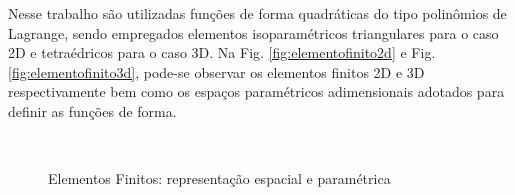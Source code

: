 \documentclass[tese_patricia]{subfiles}%
\begin{document}
Nesse trabalho são utilizadas funções de forma quadráticas do tipo polinômios de Lagrange, sendo empregados elementos isoparamétricos triangulares para o caso 2D e tetraédricos para o caso 3D. Na Fig. \ref{fig:elementofinito2d} e Fig. \ref{fig:elementofinito3d}, pode-se observar os elementos finitos 2D e 3D respectivamente bem como os espaços paramétricos adimensionais adotados para definir as funções de forma. 

\begin{figure}[!htb]
	\centering	
	\\
	\caption{Elementos Finitos: representação espacial e paramétrica}
\end{figure}
\end{document}
